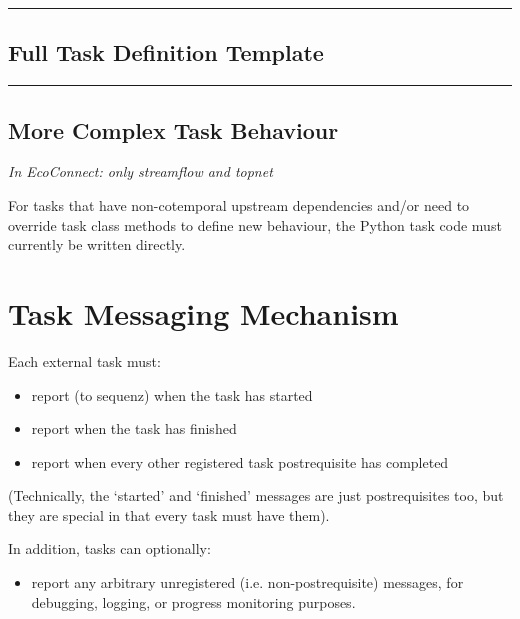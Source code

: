 \documentclass[11pt,a4paper]{article}
\begin{document}
\lstset{language=sh, numbers=left}

{\tiny
\noindent
\rule{5cm}{.2mm}

}

\subsection{Full Task Definition Template}

\lstset{language=sh, numbers=left}

{\tiny
\noindent
\rule{5cm}{.2mm}

}

\subsection{More Complex Task Behaviour}

\textit{In EcoConnect: only streamflow and topnet}

For tasks that have non-cotemporal upstream dependencies and/or need to  
override task class methods to define new behaviour, the Python task
code must currently be written directly. 

\section{Task Messaging Mechanism}

Each external task must:

\begin{itemize}
\item report (to sequenz) when the task has started
\item report when the task has finished
\item report when every other registered task postrequisite has
completed
\end{itemize}

(Technically, the `started' and `finished' messages are just
postrequisites too, but they are special in that every task
must have them).

In addition, tasks can optionally:

\begin{itemize}
\item report any arbitrary unregistered (i.e. non-postrequisite)
messages, for debugging, logging, or progress monitoring purposes.
\end{itemize}
\end{document}
